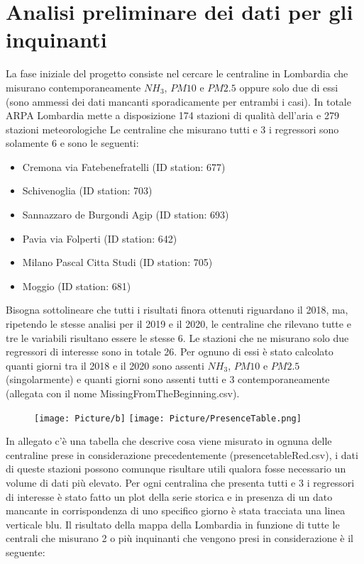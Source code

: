\documentclass{article}
\begin{document}
\section{Analisi preliminare dei dati per gli inquinanti}
La fase iniziale del progetto consiste nel cercare le centraline in Lombardia
che misurano contemporaneamente $NH_{3}$, $PM10$ e $PM2.5$ oppure solo due di essi
(sono ammessi dei dati mancanti sporadicamente per entrambi i casi). In totale 
ARPA Lombardia mette a disposizione 174 stazioni di qualità dell'aria e 279 stazioni 
meteorologiche  
Le centraline che misurano tutti e 3 i regressori sono solamente 6 e sono le seguenti:
\begin{itemize}
    \item Cremona via Fatebenefratelli (ID station: 677)
    \item Schivenoglia (ID station: 703)
    \item Sannazzaro de Burgondi Agip (ID station: 693)
    \item Pavia via Folperti (ID station: 642)
    \item Milano Pascal Citta Studi (ID station: 705)
    \item Moggio (ID station: 681)
\end{itemize}
Bisogna sottolineare che tutti i risultati finora ottenuti riguardano il 2018, ma, ripetendo le stesse analisi per il 2019 e il 2020, 
le centraline che rilevano tutte e tre le variabili risultano essere le stesse 6.
Le stazioni che ne misurano solo due regressori di interesse sono in totale 26.
Per ognuno di essi è stato calcolato quanti giorni tra il 2018 e il 2020 sono assenti
$NH_{3}$, $PM10$ e $PM2.5$ (singolarmente) e quanti giorni sono assenti tutti e 3 contemporaneamente
(allegata con il nome MissingFromTheBeginning.csv). 
\begin{figure}[]
  \centering
  \texttt{[image: Picture/b]}
  \centering
  \texttt{[image: Picture/PresenceTable.png]}
\end{figure}

In allegato c'è una tabella che descrive cosa viene misurato in ognuna
delle centraline prese in considerazione precedentemente (presencetableRed.csv), i dati di queste stazioni possono comunque risultare utili qualora fosse necessario un volume di dati più elevato.
Per ogni centralina che presenta tutti e 3 i regressori di interesse è stato fatto
un plot della serie storica e in presenza di un dato mancante in corrispondenza
di uno specifico giorno è stata tracciata una linea verticale blu.
Il risultato della mappa della Lombardia in funzione di tutte le centrali che misurano 2 o più inquinanti che 
vengono presi in considerazione è il seguente:
\end{document}
